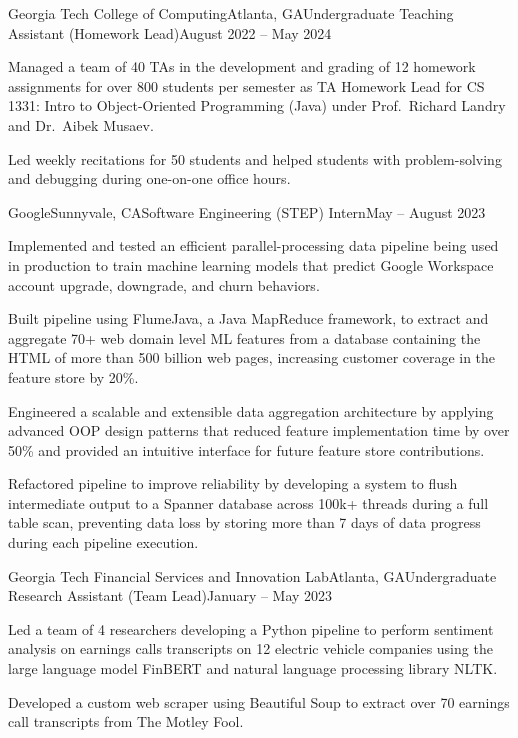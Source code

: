 \documentclass{article}
\begin{document}
\begin{flushleft}
    \begin{experience}{Georgia Tech College of Computing}{Atlanta, GA}{Undergraduate Teaching Assistant (Homework Lead)}{August 2022 -- May 2024}
        \item Managed a team of 40 TAs in the development and grading of 12 homework assignments for over 800 students per semester as TA Homework Lead for CS 1331: Intro to Object-Oriented Programming (Java) under Prof.~Richard Landry and Dr.~Aibek Musaev.
        \item Led weekly recitations for 50 students and helped students with problem-solving and debugging during one-on-one office hours.
    \end{experience}

    \begin{experience}{Google}{Sunnyvale, CA}{Software Engineering (STEP) Intern}{May -- August 2023}
        \item Implemented and tested an efficient parallel-processing data pipeline being used in production to train machine learning models that predict Google Workspace account upgrade, downgrade, and churn behaviors.
        \item Built pipeline using FlumeJava, a Java MapReduce framework, to extract and aggregate 70+ web domain level ML features from a database containing the HTML of more than 500 billion web pages, increasing customer coverage in the feature store by 20\%.
        \item Engineered a scalable and extensible data aggregation architecture by applying advanced OOP design patterns that reduced feature implementation time by over 50\% and provided an intuitive interface for future feature store contributions.
        \item Refactored pipeline to improve reliability by developing a system to flush intermediate output to a Spanner database across 100k+ threads during a full table scan, preventing data loss by storing more than 7 days of data progress during each pipeline execution.
    \end{experience}

    \begin{experience}{Georgia Tech Financial Services and Innovation Lab}{Atlanta, GA}{Undergraduate Research Assistant (Team Lead)}{January -- May 2023}
        \item Led a team of 4 researchers developing a Python pipeline to perform sentiment analysis on earnings calls transcripts on 12 electric vehicle companies using the large language model FinBERT and natural language processing library NLTK.
        \item Developed a custom web scraper using Beautiful Soup to extract over 70 earnings call transcripts from The Motley Fool.
    \end{experience}



\end{flushleft}
\end{document}

